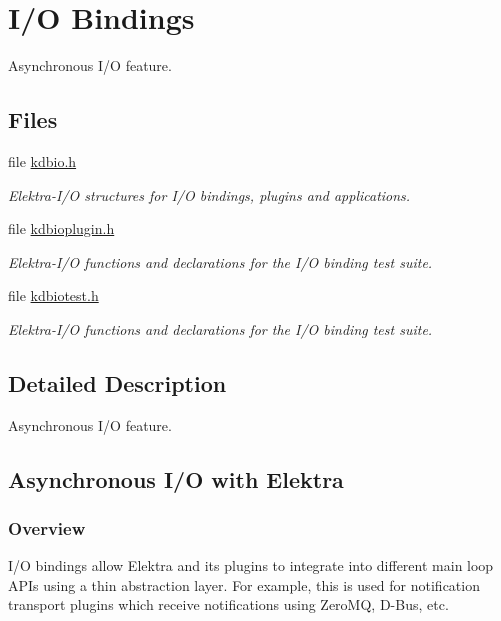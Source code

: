 \hypertarget{group__kdbio}{}\section{I/O Bindings}
\label{group__kdbio}


Asynchronous I/O feature.  


\subsection*{Files}
\begin{DoxyCompactItemize}
\item 
file \hyperlink{kdbio_8h}{kdbio.\+h}
\begin{DoxyCompactList}\small\item\em Elektra-\/\+I/O structures for I/O bindings, plugins and applications. \end{DoxyCompactList}\item 
file \hyperlink{kdbioplugin_8h}{kdbioplugin.\+h}
\begin{DoxyCompactList}\small\item\em Elektra-\/\+I/O functions and declarations for the I/O binding test suite. \end{DoxyCompactList}\item 
file \hyperlink{kdbiotest_8h}{kdbiotest.\+h}
\begin{DoxyCompactList}\small\item\em Elektra-\/\+I/O functions and declarations for the I/O binding test suite. \end{DoxyCompactList}\end{DoxyCompactItemize}


\subsection{Detailed Description}
Asynchronous I/O feature. 

\hypertarget{group__kdbio_async}{}\subsection{Asynchronous I/\+O with Elektra}\label{group__kdbio_async}
\hypertarget{group__kdbio_Overview}{}\subsubsection{Overview}\label{group__kdbio_Overview}
I/O bindings allow Elektra and its plugins to integrate into different main loop A\+P\+Is using a thin abstraction layer. For example, this is used for notification transport plugins which receive notifications using Zero\+MQ, D-\/\+Bus, etc.

